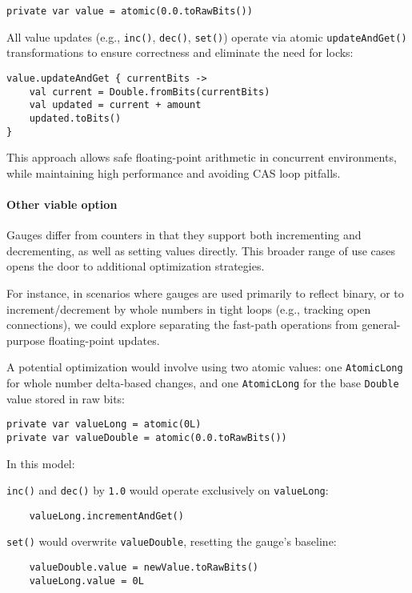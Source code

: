 \begin{verbatim}
private var value = atomic(0.0.toRawBits())
\end{verbatim}

All value updates (e.g., \texttt{inc()}, \texttt{dec()}, \texttt{set()}) operate via atomic \texttt{updateAndGet()} transformations to ensure correctness and eliminate the need for locks:

\begin{verbatim}
value.updateAndGet { currentBits ->
    val current = Double.fromBits(currentBits)
    val updated = current + amount
    updated.toBits()
}
\end{verbatim}

This approach allows safe floating-point arithmetic in concurrent environments, while maintaining high performance and avoiding CAS loop pitfalls.


\paragraph{Other viable option}
Gauges differ from counters in that they support both incrementing and decrementing, as well as setting values directly. This broader range of use cases opens the door to additional optimization strategies.

For instance, in scenarios where gauges are used primarily to reflect binary, or to increment/decrement by whole numbers in tight loops (e.g., tracking open connections), we could explore separating the fast-path operations from general-purpose floating-point updates.

A potential optimization would involve using two atomic values: one \texttt{AtomicLong} for whole number delta-based changes, and one \texttt{AtomicLong} for the base \texttt{Double} value stored in raw bits:

\begin{verbatim}
private var valueLong = atomic(0L)
private var valueDouble = atomic(0.0.toRawBits())
\end{verbatim}

In this model:

    \texttt{inc()} and \texttt{dec()} by \texttt{1.0} would operate exclusively on \texttt{valueLong}:
    \begin{verbatim}
    valueLong.incrementAndGet()
    \end{verbatim}

    \texttt{set()} would overwrite \texttt{valueDouble}, resetting the gauge’s baseline:
    \begin{verbatim}
    valueDouble.value = newValue.toRawBits()
    valueLong.value = 0L
    \end{verbatim}

